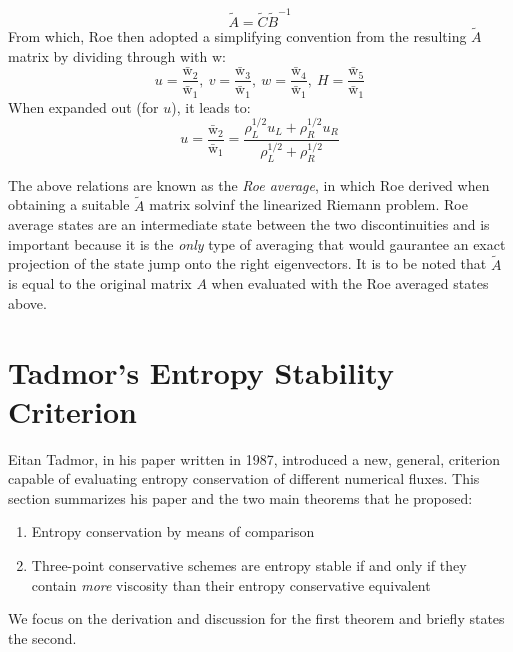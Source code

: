 \documentclass[a4paper]{article}
\numberwithin{equation}{section}
\begin{document}
\begin{equation}
    \tilde{A} = \tilde{C}\tilde{B}^{-1}
\end{equation}
From which, Roe then adopted a simplifying convention from the resulting $\tilde{A}$ matrix by dividing through with $\mathrm{w}$:
\begin{equation}
    u = \frac{\bar{\mathrm{w}}_2}{\bar{\mathrm{w}}_1}, \ v = \frac{\bar{\mathrm{w}}_3}{\bar{\mathrm{w}}_1}, \ w = \frac{\bar{\mathrm{w}}_4}{\bar{\mathrm{w}}_1}, \ H = \frac{\bar{\mathrm{w}}_5}{\bar{\mathrm{w}}_1}
\end{equation}
When expanded out (for $u$), it leads to:
\begin{equation}
    u = \frac{\bar{\mathrm{w}}_2}{\bar{\mathrm{w}}_1} = \frac{\rho^{1/2}_L u_L + \rho^{1/2}_R u_R}{\rho_L^{1/2} + \rho_R^{1/2}}
\end{equation}

The above relations are known as the \textit{Roe average}, in which Roe derived when obtaining a suitable $\tilde{A}$ matrix solvinf the linearized Riemann problem. Roe average states are an intermediate state between the two discontinuities and is important because it is the \textit{only} type of averaging that would gaurantee an exact projection of the state jump onto the right eigenvectors. It is to be noted that $\tilde{A}$ is equal to the original matrix $A$ when evaluated with the Roe averaged states above.
\section{Tadmor's Entropy Stability Criterion}
Eitan Tadmor, in his paper written in 1987, introduced a new, general, criterion capable of evaluating entropy conservation of different numerical fluxes. This section summarizes his paper and the two main theorems that he proposed:
\begin{enumerate}
    \item Entropy conservation by means of comparison
    \item Three-point conservative schemes are entropy stable if and only if they contain \textit{more} viscosity than their entropy conservative equivalent
\end{enumerate}
We focus on the derivation and discussion for the first theorem and briefly states the second.

\end{document}
